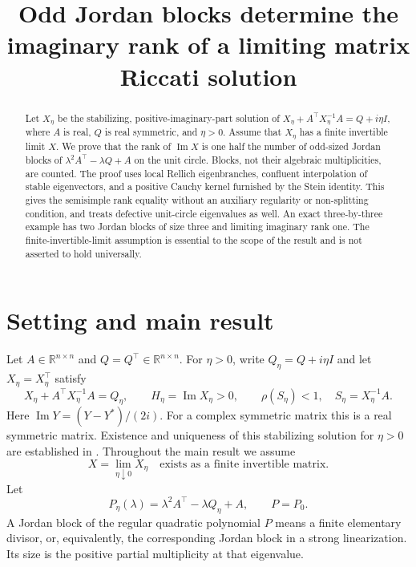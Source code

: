 \documentclass[11pt]{article}
\title{Odd Jordan blocks determine the imaginary rank of a limiting matrix Riccati solution}
\author{}
\date{}
\newcommand{\R}{\mathbb R}
\newcommand{\Ima}{\operatorname{Im}}
\begin{document}
\maketitle
\begin{abstract}
Let $X_\eta$ be the stabilizing, positive-imaginary-part solution of
$X_\eta+A^\top X_\eta^{-1}A=Q+i\eta I$, where $A$ is real, $Q$ is real symmetric, and $\eta>0$.
Assume that $X_\eta$ has a finite invertible limit $X$.
We prove that the rank of $\Ima X$ is one half the number of odd-sized Jordan blocks of
$\lambda^2A^\top-\lambda Q+A$ on the unit circle. Blocks, not their algebraic multiplicities, are counted.
The proof uses local Rellich eigenbranches, confluent interpolation of stable eigenvectors,
and a positive Cauchy kernel furnished by the Stein identity.
This gives the semisimple rank equality without an auxiliary regularity or non-splitting condition,
and treats defective unit-circle eigenvalues as well.
An exact three-by-three example has two Jordan blocks of size three and limiting imaginary rank one.
The finite-invertible-limit assumption is essential to the scope of the result and is not asserted to hold universally.
\end{abstract}

\section{Setting and main result}
Let $A\in\R^{n\times n}$ and $Q=Q^\top\in\R^{n\times n}$.
For $\eta>0$, write $Q_\eta=Q+i\eta I$ and let $X_\eta=X_\eta^\top$ satisfy
\begin{equation}\label{eq:riccati}
X_\eta+A^\top X_\eta^{-1}A=Q_\eta,
\qquad H_\eta=\Ima X_\eta>0,
\qquad \rho(S_\eta)<1,\quad S_\eta=X_\eta^{-1}A.
\end{equation}
Here $\Ima Y=(Y-Y^*)/(2i)$. For a complex symmetric matrix this is a real symmetric matrix.
Existence and uniqueness of this stabilizing solution for $\eta>0$ are established in
\cite[Theorem~2.2 and Remark~2.1]{GKL}. Throughout the main result we assume
\begin{equation}\label{eq:limit}
X=\lim_{\eta\downarrow0}X_\eta\quad\text{exists as a finite invertible matrix}.
\end{equation}
Let
\[
P_\eta(\lambda)=\lambda^2A^\top-\lambda Q_\eta+A,\qquad P=P_0.
\]
A Jordan block of the regular quadratic polynomial $P$ means a finite elementary divisor,
or, equivalently, the corresponding Jordan block in a strong linearization.
Its size is the positive partial multiplicity at that eigenvalue.
\end{document}
